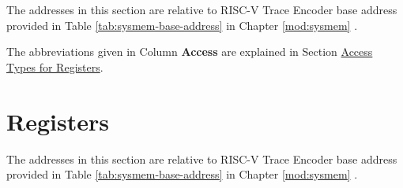 \documentclass[main\_\_EN.tex]{subfiles}
\begin{document}
The addresses in this section are relative to RISC-V Trace Encoder base address provided in Table \ref{tab:sysmem-base-address} in Chapter \ref{mod:sysmem} \textit{}.

The abbreviations given in Column \textbf{Access} are explained in Section \hyperref[glossary-access-types]{Access Types for Registers}.






\clearpage
\section{Registers}

The addresses in this section are relative to RISC-V Trace Encoder base address provided in Table \ref{tab:sysmem-base-address} in Chapter \ref{mod:sysmem} \textit{}.


\end{document}
